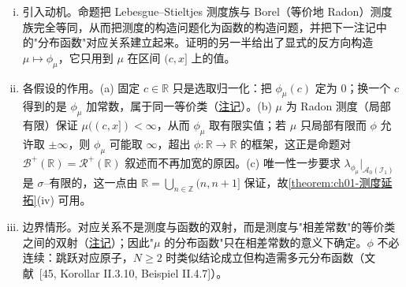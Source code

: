 \documentclass[../../main.tex]{subfiles}%
\begin{document}
\begin{remark}\label{remark:ch01-Stieltjes等于Radon}
\begin{enumerate}[(i)]
\item 引入动机。命题把 Lebesgue--Stieltjes 测度族与 Borel（等价地 Radon）测度族完全等同，从而把测度的构造问题化为函数的构造问题，并把下一注记中的"分布函数"对应关系建立起来。证明的另一半给出了显式的反方向构造 $\mu\mapsto\phi_\mu$，它只用到 $\mu$ 在区间 $(c,x]$ 上的值。
\item 各假设的作用。(a) 固定 $c\in\mathbb{R}$ 只是选取归一化：把 $\phi_\mu(c)$ 定为 $0$；换一个 $c$ 得到的是 $\phi_\mu$ 加常数，属于同一等价类（\hyperref[remark:ch01-分布函数]{注记}）。(b) $\mu$ 为 Radon 测度（局部有限）保证 $\mu((c,x])<\infty$，从而 $\phi_\mu$ 取有限实值；若 $\mu$ 只局部有限而 $\phi$ 允许取 $\pm\infty$，则 $\phi_\mu$ 可能取 $\infty$，超出 $\phi:\mathbb{R}\to\mathbb{R}$ 的框架，这正是命题对 $\mathcal{B}^+(\mathbb{R})=\mathcal{R}^+(\mathbb{R})$ 叙述而不再加宽的原因。(c) 唯一性一步要求 $\lambda_{\phi_\mu}|_{\mathcal{A}_0(\mathcal{I}_1)}$ 是 $\sigma$--有限的，这一点由 $\mathbb{R}=\bigcup_{n\in\mathbb{Z}}(n,n+1]$ 保证，故\cref{theorem:ch01-测度延拓}(iv) 可用。
\item 边界情形。对应关系不是测度与函数的双射，而是测度与"相差常数"的等价类之间的双射（\hyperref[remark:ch01-分布函数]{注记}）；因此"$\mu$ 的分布函数"只在相差常数的意义下确定。$\phi$ 不必连续：跳跃对应原子，$N\geqslant2$ 时类似结论成立但构造需多元分布函数（文献~[45, Korollar II.3.10, Beispiel II.4.7]）。
\end{enumerate}
\end{remark}
\end{document}
